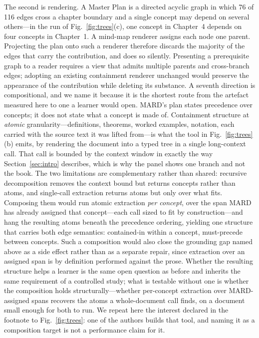 \documentclass[conference]{IEEEtran}
\begin{document}
The second is rendering. A Master Plan is a directed acyclic graph in which
\num{76} of \num{116} edges cross a chapter boundary and a single concept may
depend on several others---in the run of Fig.~\ref{fig:trees}(c), one concept
in Chapter~4 depends on four concepts in Chapter~1. A mind-map renderer
assigns each node one parent. Projecting the plan onto such a renderer
therefore discards the majority of the edges that carry the contribution, and
does so silently. Presenting a prerequisite graph to a reader requires a view
that admits multiple parents and cross-branch edges; adopting an existing
containment renderer unchanged would preserve the appearance of the
contribution while deleting its substance.
A seventh direction is compositional, and we name it because it is the
shortest route from the artefact measured here to one a learner would open.
MARD's plan states precedence over concepts; it does not state what a concept
is made of. Containment structure at \emph{atomic} granularity---definitions,
theorems, worked examples, notation, each carried with the source text it was
lifted from---is what the tool in Fig.~\ref{fig:trees}(b) emits, by rendering
the document into a typed tree in a single long-context call. That call is
bounded by the context window in exactly the way Section~\ref{sec:intro}
describes, which is why the panel shows one branch and not the book. The two
limitations are complementary rather than shared: recursive decomposition
removes the context bound but returns concepts rather than atoms, and
single-call extraction returns atoms but only over what fits. Composing them
would run atomic extraction \emph{per concept}, over the span MARD has already
assigned that concept---each call sized to fit by construction---and hang the
resulting atoms beneath the precedence ordering, yielding one structure that
carries both edge semantics: contained-in within a concept, must-precede
between concepts. Such a composition would also close the grounding gap named
above as a side effect rather than as a separate repair, since extraction over
an assigned span is by definition performed against the prose. Whether the
resulting structure helps a learner is the same open question as before and
inherits the same requirement of a controlled study; what is testable without
one is whether the composition holds structurally---whether per-concept
extraction over MARD-assigned spans recovers the atoms a whole-document call
finds, on a document small enough for both to run. We repeat here the interest
declared in the footnote to Fig.~\ref{fig:trees}: one of the authors builds
that tool, and naming it as a composition target is not a performance claim
for it.
\end{document}
